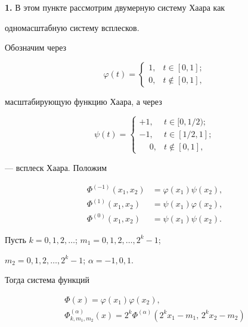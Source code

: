 {\bf 1.} В этом пункте рассмотрим двумерную систему Хаара как 


одномасштабную систему всплесков. 


Обозначим через 


$$ 


\varphi(t)= 


\begin{cases} 


1, & t\in[0,1];\\ 


0, & t\notin[0,1], 


\end{cases} 


$$ 


масштабирующую функцию Хаара, а через 


$$ 


\psi(t)= 


\begin{cases} 


+1, & t\in[0,1/2);\\ 


-1, & t\in[1/2,1];\\ 


\phantom{-}0, & t\notin[0,1], 


\end{cases} 


$$ 


--- всплеск Хаара. Положим 


\begin{align*} 


\Phi^{(-1)}(x_1,x_2)&=\varphi(x_1)\psi(x_2),\\ 


\Phi^{(1)}(x_1,x_2)&=\psi(x_1)\varphi(x_2),\\ 


\Phi^{(0)}(x_1,x_2)&=\psi(x_1)\psi(x_2). 


\end{align*} 


Пусть $k=0,1,2,\dotsc$; $m_1=0,1,2,\dotsc,2^k-1$; 


$m_2=0,1,2,\dotsc,2^k-1$; $\alpha=-1,0,1$. 


Тогда система функций 


\begin{equation} 


\begin{array}{c} 


\Phi(x)=\varphi(x_1)\varphi(x_2),\\[2mm] 


\Phi^{(\alpha)}_{k,m_1,m_2}(x)=2^k\Phi^{(\alpha)} 


(2^k x_1-m_1,\,2^k x_2-m_2) 


\end{array} 


\end{equation} 


